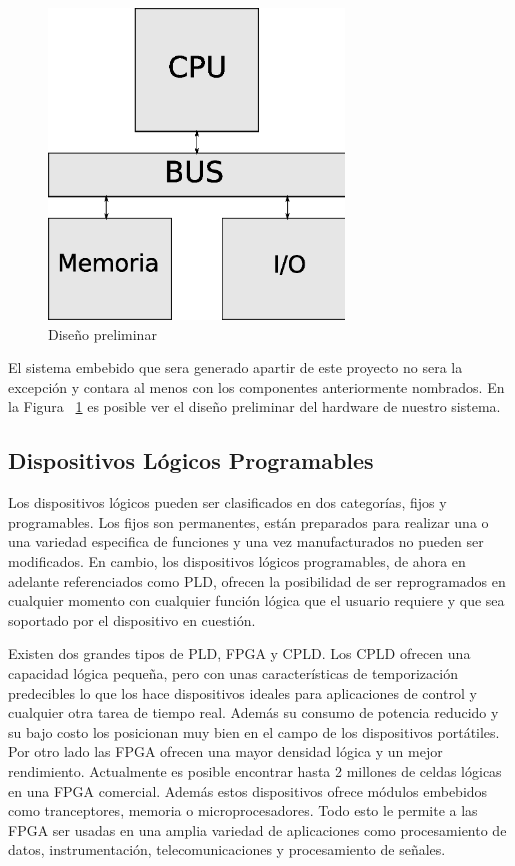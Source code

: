 \begin{figure}[h]
  \centering
	\includegraphics[width=0.70\textwidth]{2-sistema/graf/general.eps}
  \caption{Diseño preliminar}
  \label{fig:diseno}
\end{figure}

El sistema embebido que sera generado apartir de este proyecto no sera la excepción y contara al menos con los componentes anteriormente nombrados. En la Figura ~\ref{fig:diseno} es posible ver el diseño preliminar del hardware de nuestro sistema.




\subsection{Dispositivos Lógicos Programables}
Los dispositivos lógicos pueden ser clasificados en dos categorías, fijos y programables. Los fijos son permanentes, están preparados para realizar una o una variedad especifica de funciones y una vez manufacturados no pueden ser modificados.
En cambio, los dispositivos lógicos programables, de ahora en adelante referenciados como PLD, ofrecen la posibilidad de ser reprogramados en cualquier momento con cualquier función lógica que el usuario requiere y que sea soportado por el dispositivo en cuestión.	

Existen dos grandes tipos de PLD, FPGA y CPLD. Los CPLD ofrecen una capacidad lógica pequeña, pero con unas características de temporización predecibles lo que los hace dispositivos ideales para aplicaciones de control y cualquier otra tarea de tiempo real. Además su consumo de potencia reducido y su bajo costo los posicionan muy bien en el campo de los dispositivos portátiles.
Por otro lado las FPGA ofrecen una mayor densidad lógica y un mejor rendimiento. Actualmente es posible encontrar hasta 2 millones de celdas lógicas en una FPGA comercial. Además estos dispositivos ofrece módulos embebidos como tranceptores, memoria o microprocesadores. Todo esto le permite a las FPGA ser usadas en una amplia variedad de aplicaciones como procesamiento de datos, instrumentación, telecomunicaciones y procesamiento de señales.

